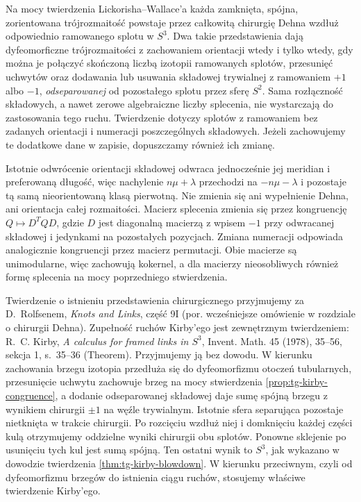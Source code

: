 \begin{twierdzenie}
Na mocy twierdzenia Lickorisha--Wallace'a każda zamknięta,
spójna, zorientowana trójrozmaitość powstaje przez
całkowitą chirurgię Dehna wzdłuż odpowiednio
ramowanego splotu w $S^3$.
Dwa takie przedstawienia dają dyfeomorficzne
trójrozmaitości z zachowaniem orientacji wtedy i tylko wtedy,
gdy można je połączyć skończoną liczbą izotopii
ramowanych splotów, przesunięć uchwytów oraz
dodawania lub usuwania składowej trywialnej
z ramowaniem $+1$ albo $-1$, \emph{odseparowanej}
od pozostałego splotu przez sferę $S^2$.
Sama rozłączność składowych, a nawet zerowe
algebraiczne liczby splecenia, nie wystarczają
do zastosowania tego ruchu. Twierdzenie dotyczy
splotów z ramowaniem bez zadanych orientacji
i numeracji poszczególnych składowych. Jeżeli
zachowujemy te dodatkowe dane w zapisie,
dopuszczamy również ich zmianę.
\end{twierdzenie}

Istotnie odwrócenie orientacji składowej odwraca
jednocześnie jej meridian i preferowaną długość,
więc nachylenie $n\mu+\lambda$ przechodzi na
$-n\mu-\lambda$ i pozostaje tą samą nieorientowaną
klasą pierwotną. Nie zmienia się ani wypełnienie
Dehna, ani orientacja całej rozmaitości.
Macierz splecenia zmienia się przez kongruencję
$Q\mapsto D^TQD$, gdzie $D$ jest diagonalną
macierzą z wpisem $-1$ przy odwracanej składowej
i jedynkami na pozostałych pozycjach.
Zmiana numeracji odpowiada analogicznie kongruencji
przez macierz permutacji. Obie macierze są
unimodularne, więc zachowują kokernel,
a dla macierzy nieosobliwych również formę
splecenia na mocy poprzedniego stwierdzenia.

Twierdzenie o istnieniu przedstawienia chirurgicznego
przyjmujemy za D.~Rolfsenem, \emph{Knots and Links},
część 9I (por. wcześniejsze omówienie w rozdziale
o chirurgii Dehna). Zupełność ruchów Kirby'ego
jest zewnętrznym twierdzeniem:
R.~C. Kirby, \emph{A calculus for framed links
in $S^3$}, Invent. Math. 45 (1978), 35--56,
sekcja 1, s.~35--36 (Theorem).
Przyjmujemy ją bez dowodu.
W kierunku zachowania brzegu izotopia przedłuża
się do dyfeomorfizmu otoczeń tubularnych,
przesunięcie uchwytu zachowuje brzeg na mocy
stwierdzenia \ref{prop:tg-kirby-congruence},
a dodanie odseparowanej składowej daje sumę spójną
brzegu z wynikiem chirurgii $\pm1$ na węźle
trywialnym. Istotnie sfera separująca pozostaje
nietknięta w trakcie chirurgii. Po rozcięciu wzdłuż
niej i domknięciu każdej części kulą otrzymujemy
oddzielne wyniki chirurgii obu splotów. Ponowne
sklejenie po usunięciu tych kul jest sumą spójną. Ten ostatni wynik to $S^3$, jak
wykazano w dowodzie twierdzenia
\ref{thm:tg-kirby-blowdown}.
W kierunku przeciwnym, czyli od dyfeomorfizmu
brzegów do istnienia ciągu ruchów, stosujemy
właściwe twierdzenie Kirby'ego.

